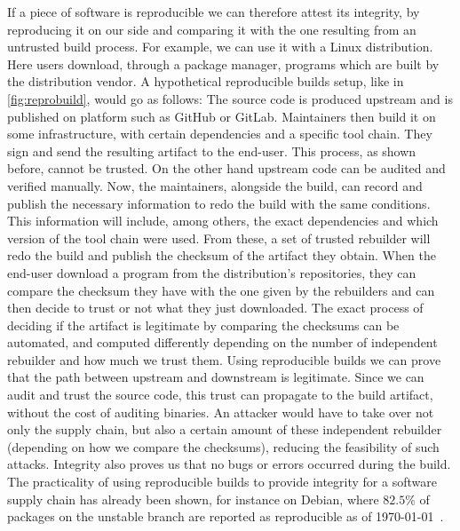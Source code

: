 \documentclass[a4paper,11pt,oneside]{report}
\theoremstyle{definition}
\newcommand{\rb}{reproducible builds\xspace}
\begin{document}
If a piece of software is reproducible we can therefore attest its integrity,
by reproducing it on our side and comparing it with the one resulting from an
untrusted build process. For example, we can use it with a Linux distribution.
Here users download, through a package manager, programs which are built by the
distribution vendor. A hypothetical \rb setup, like in
\autoref{fig:reprobuild}, would go as follows: The source code is produced
upstream and is published on platform such as GitHub or GitLab. Maintainers
then build it on some infrastructure, with certain dependencies and a specific
tool chain. They sign and send the resulting artifact to the end-user. This
process, as shown before, cannot be trusted. On the other hand upstream code
can be audited and verified manually. Now, the maintainers, alongside the
build, can record and publish the necessary information to redo the build
with the same conditions. This information will include, among others, the
exact dependencies and which version of the tool chain were used. From these, a
set of trusted rebuilder will redo the build and publish
the checksum of the artifact they obtain. When the end-user download a program
from the distribution's repositories, they can compare the checksum they have
with the one given by the rebuilders and can then decide to trust or not what
they just downloaded. The exact process of deciding if the artifact is
legitimate by comparing the checksums can be automated, and computed
differently depending on the number of independent rebuilder and how much we
trust them.
Using \rb we can prove that the path between upstream and downstream is
legitimate. Since we can audit and trust the source code, this trust can
propagate to the build artifact, without the cost of auditing binaries. An
attacker would have to take over not only the supply chain, but also a certain
amount of these independent rebuilder (depending on how we compare the
checksums), reducing the feasibility of such attacks. Integrity also proves us
that no bugs or errors occurred during the build. The practicality of using \rb
to provide integrity for a software supply chain has already been shown, for
instance on Debian, where $82.5\%$ of packages on the unstable branch are
reported as reproducible as of \today~\cite{debian:repro}.
\end{document}
